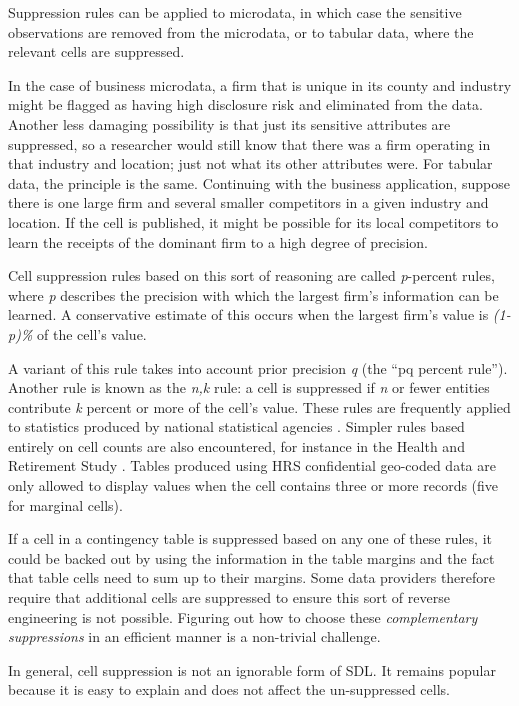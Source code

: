 \documentclass[
]{WileySix}
\begin{document}
Suppression rules can be applied to microdata, in which case the sensitive observations are removed from the microdata, or to tabular data, where the relevant cells are suppressed.

In the case of business microdata, a firm that is unique in its county and industry might be flagged as having high disclosure risk and eliminated from the data. Another less damaging possibility is that just its sensitive attributes are suppressed, so a researcher would still know that there was a firm operating in that industry and location; just not what its other attributes were. For tabular data, the principle is the same. Continuing with the business application, suppose there is one large firm and several smaller competitors in a given industry and location. If the cell is published, it might be possible for its local competitors to learn the receipts of the dominant firm to a high degree of precision.

Cell suppression rules based on this sort of reasoning are called \emph{p}-percent rules, where \emph{p} describes the precision with which the largest firm's information can be learned. A conservative estimate of this occurs when the largest firm's value is \emph{(1-p)\%} of the cell's value.

A variant of this rule takes into account prior precision \emph{q} (the ``pq percent rule''). Another rule is known as the \emph{n,k} rule: a cell is suppressed if \emph{n} or fewer entities contribute \emph{k} percent or more of the cell's value. These rules are frequently applied to statistics produced by national statistical agencies \citep{harris-kojetin_statistical_2005}. Simpler rules based entirely on cell counts are also encountered, for instance in the Health and Retirement Study \citep{health_and_retirement_study_disclosure_nodate}. Tables produced using HRS confidential geo-coded data are only allowed to display values when the cell contains three or more records (five for marginal cells).

If a cell in a contingency table is suppressed based on any one of these rules, it could be backed out by using the information in the table margins and the fact that table cells need to sum up to their margins. Some data providers therefore require that additional cells are suppressed to ensure this sort of reverse engineering is not possible. Figuring out how to choose these \emph{complementary suppressions} in an efficient manner is a non-trivial challenge.

In general, cell suppression is not an ignorable form of SDL. It remains popular because it is easy to explain and does not affect the un-suppressed cells.
\end{document}
